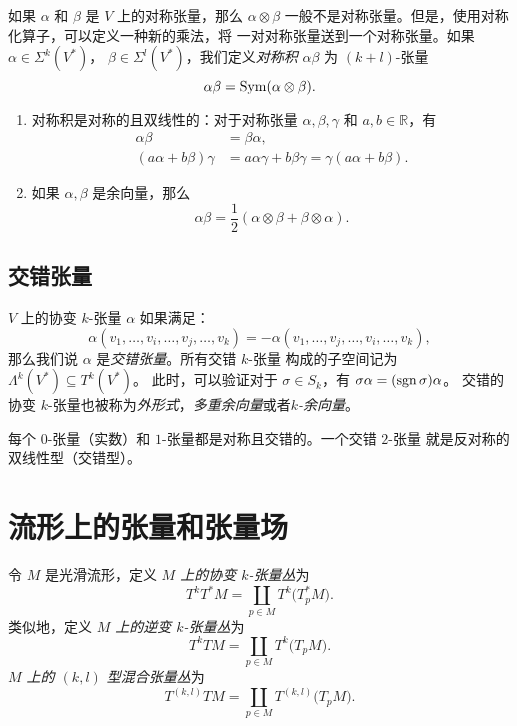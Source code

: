 如果 $\alpha$ 和 $\beta$ 是 $V$ 上的对称张量，那么 $\alpha\otimes\beta$
一般不是对称张量。但是，使用对称化算子，可以定义一种新的乘法，将
一对对称张量送到一个对称张量。如果 $\alpha\in \Sigma^k(V^*)$，
$\beta\in \Sigma^l(V^*)$，我们定义\emph{对称积} $\alpha\beta$
为 $(k+l)$-张量
\[
  \alpha\beta=\operatorname{Sym}(\alpha\otimes\beta).  
\]

\begin{proposition}[对称积的性质]
  \mbox{}
  \begin{enumerate}
    \item 对称积是对称的且双线性的：对于对称张量 $\alpha,\beta,\gamma$
    和 $a,b\in \mathbb{R}$，有
    \begin{align*}
      \alpha\beta&=\beta\alpha,\\
      (a\alpha+b\beta)\gamma&=a\alpha\gamma+b\beta\gamma=
      \gamma(a\alpha+b\beta).
    \end{align*}
    \item 如果 $\alpha,\beta$ 是余向量，那么
    \[
      \alpha\beta=\frac{1}{2}(\alpha\otimes\beta+\beta\otimes\alpha).  
    \]
  \end{enumerate}
\end{proposition}

\subsection{交错张量}

$V$ 上的协变 $k$-张量 $\alpha$ 如果满足：
\[
  \alpha(v_1,\dots,v_i,\dots,v_j,\dots,v_k)=
  -\alpha(v_1,\dots,v_j,\dots,v_i,\dots,v_k),
\]
那么我们说 $\alpha$ 是\emph{交错张量}。所有交错 $k$-张量
构成的子空间记为 $\Lambda^k(V^*)\subseteq T^k(V^*)$。
此时，可以验证对于 $\sigma\in S_k$，有 $\sigma\alpha=(\operatorname{sgn}\sigma)\alpha$。
交错的协变 $k$-张量也被称为\emph{外形式}，\emph{多重余向量}或者\emph{$k$-余向量}。

每个 $0$-张量（实数）和 $1$-张量都是对称且交错的。一个交错 $2$-张量
就是反对称的双线性型（交错型）。


\section{流形上的张量和张量场}

令 $M$ 是光滑流形，定义 \emph{$M$ 上的协变 $k$-张量丛}为
\[
  T^kT^*M=\coprod_{p\in M}T^k\bigl(T_p^*M\bigr).  
\] 
类似地，定义 \emph{$M$ 上的逆变 $k$-张量丛}为
\[
  T^kTM=\coprod_{p\in M}T^k\bigl(T_pM\bigr)  .
\]
\emph{$M$ 上的 $(k,l)$ 型混合张量丛}为
\[
  T^{(k,l)}TM=\coprod_{p\in M}  T^{(k,l)}\bigl(T_pM\bigr).
\]

